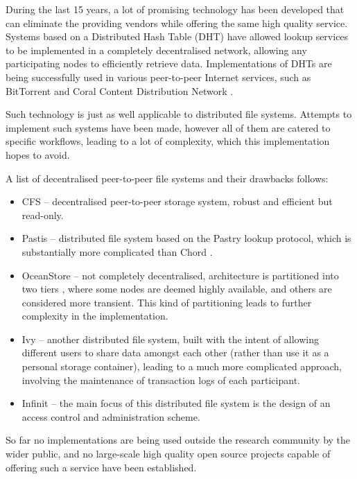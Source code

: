 \documentclass[8pt,a4paper]{article}
\begin{document}
During the last 15 years, a lot of promising technology has been developed that can eliminate the providing vendors while offering the same high quality service. 
Systems based on a Distributed Hash Table (DHT) have allowed lookup services to be implemented in a completely decentralised network, allowing any participating nodes to efficiently retrieve data. Implementations of DHTs are being successfully used in various peer-to-peer Internet services, such as BitTorrent and Coral Content Distribution Network \cite{coral}.

Such technology is just as well applicable to distributed file systems. Attempts to implement such systems have been made, however all of them are catered to specific workflows, leading to a lot of complexity, which this implementation hopes to avoid.

A list of decentralised peer-to-peer file systems and their drawbacks follows:

\begin{itemize}
  \item CFS \cite{cfs} -- decentralised peer-to-peer storage system, robust and efficient but read-only.
  \item Pastis \cite{pastis} -- distributed file system based on the Pastry lookup protocol, which is substantially more complicated than Chord \cite{chord}.
  \item OceanStore \cite{oceanstore} -- not completely decentralised, architecture is partitioned into two tiers \cite{towards}, where some nodes are deemed highly available, and others are considered more transient. This kind of partitioning leads to further complexity in the implementation.
  \item Ivy \cite{ivy} -- another distributed file system, built with the intent of allowing different users to share data amongst each other (rather than use it as a personal storage container), leading to a much more complicated approach, involving the maintenance of transaction logs of each participant.
  \item Infinit \cite{towards} -- the main focus of this distributed file system is the design of an access control and administration scheme. 
\end{itemize}

So far no implementations are being used outside the research community by the wider public, and no large-scale high quality open source projects capable of offering such a service have been established.
\end{document}
